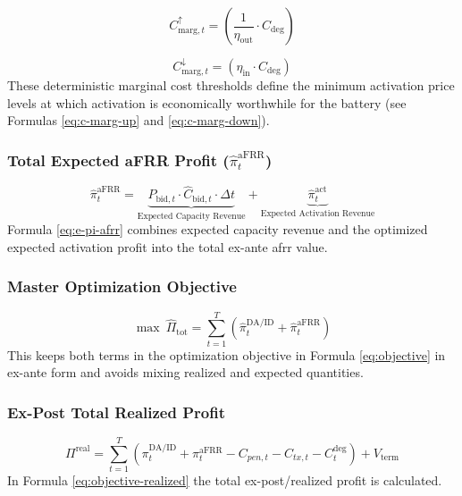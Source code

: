 \begin{equation}\label{eq:c-marg-up}
    C_{\text{marg}, t}^{\uparrow} = \left( \frac{1}{\eta_{\text{out}}} \cdot C_{\text{deg}} \right)
\end{equation}

\begin{equation}\label{eq:c-marg-down}
    C_{\text{marg}, t}^{\downarrow} = \left( \eta_{\text{in}} \cdot C_{\text{deg}} \right)
\end{equation}
These deterministic marginal cost thresholds define the minimum activation price levels at which activation is economically worthwhile for the battery (see Formulas \ref{eq:c-marg-up} and \ref{eq:c-marg-down}).


\subsubsection{Total Expected aFRR Profit ($\hat{\pi}_{t}^{\text{aFRR}}$)}

\begin{equation}\label{eq:e-pi-afrr}
    \hat{\pi}_{t}^{\text{aFRR}} =
    \underbrace{P_{\text{bid}, t} \cdot \hat{C}_{\text{bid}, t} \cdot \Delta t}_{\text{Expected Capacity Revenue}}
    +
    \underbrace{\hat{\pi}_{t}^{\text{act}}}_{\text{Expected Activation Revenue}}
\end{equation}
Formula \ref{eq:e-pi-afrr} combines expected capacity revenue and the optimized expected activation profit into the total ex-ante \gls{afrr} value.

\subsubsection{Master Optimization Objective}

\begin{equation}\label{eq:objective}
    \max \ \hat{\Pi}_{\text{tot}} = \sum_{t=1}^{T} \left(\hat{\pi}_{t}^{\text{DA/ID}} + \hat{\pi}_{t}^{\text{aFRR}}\right)
\end{equation}
This keeps both terms in the optimization objective in Formula \ref{eq:objective} in ex-ante form and avoids mixing realized and expected quantities.

\subsubsection{Ex-Post Total Realized Profit}
\begin{equation}\label{eq:objective-realized}
    \Pi^{\mathrm{real}} = \sum_{t=1}^{T}\left(\pi_{t}^{\text{DA/ID}} + \pi_{t}^{\text{aFRR}} - C_{pen,t} - C_{tx,t} - C^{\mathrm{deg}}_t\right) + V_{\mathrm{term}}
\end{equation}
In Formula \ref{eq:objective-realized} the total ex-post/realized profit is calculated.

